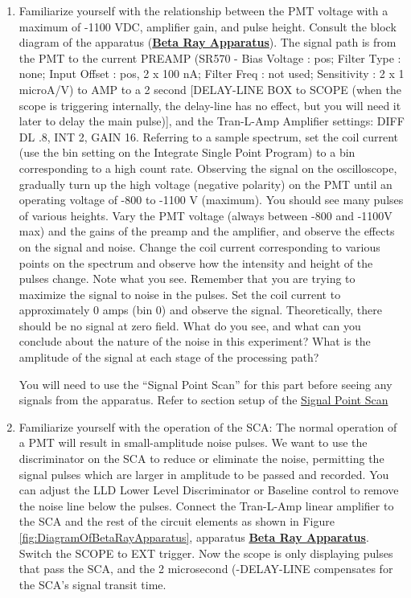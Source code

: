 \documentclass{../lab}
\begin{document}
\begin{enumerate}
    \item Familiarize yourself with the relationship between the PMT voltage with a maximum of -1100 VDC, amplifier gain, and pulse height. Consult the block diagram of the apparatus (\href{http://experimentationlab.berkeley.edu/sites/default/files/images/BRAimage010.gif}{\textbf{Beta Ray Apparatus}}). The signal path is from the PMT to the current PREAMP (SR570 - Bias Voltage : pos; Filter Type : none; Input Offset : pos, 2 x 100 nA; Filter Freq : not used; Sensitivity : 2 x 1 microA/V) to AMP to a 2 second [DELAY-LINE BOX to SCOPE (when the scope is triggering internally, the delay-line has no effect, but you will need it later to delay the main pulse)], and the Tran-L-Amp Amplifier settings: DIFF DL .8, INT 2, GAIN 16. Referring to a sample spectrum, set the coil current (use the bin setting on the Integrate Single Point Program) to a bin corresponding to a high count rate. Observing the signal on the oscilloscope, gradually turn up the high voltage (negative polarity) on the PMT until an operating voltage of -800 to -1100 V (maximum). You should see many pulses of various heights. Vary the PMT voltage (always between -800 and -1100V max) and the gains of the preamp and the amplifier, and observe the effects on the signal and noise. Change the coil current corresponding to various points on the spectrum and observe how the intensity and height of the pulses change. Note what you see. Remember that you are trying to maximize the signal to noise in the pulses. Set the coil current to approximately 0 amps (bin 0) and observe the signal. Theoretically, there should be no signal at zero field. What do you see, and what can you conclude about the nature of the noise in this experiment? What is the amplitude of the signal at each stage of the processing path?

    You will need to use the ``Signal Point Scan'' for this part before seeing any signals from the apparatus. Refer to section setup of the \hyperref[subsec:IntegrateSinglePointProgram]{Signal Point Scan}

    \item Familiarize yourself with the operation of the SCA: The normal operation of a PMT will result in small-amplitude noise pulses. We want to use the discriminator on the SCA to reduce or eliminate the noise, permitting the signal pulses which are larger in amplitude to be passed and recorded. You can adjust the LLD Lower Level Discriminator or Baseline control to remove the noise line below the pulses. Connect the Tran-L-Amp linear amplifier to the SCA and the rest of the circuit elements as shown in Figure \ref{fig:DiagramOfBetaRayApparatus}, apparatus \href{http://experimentationlab.berkeley.edu/sites/default/files/images/BRAimage010.gif}{\textbf{Beta Ray Apparatus}}. Switch the SCOPE to EXT trigger. Now the scope is only displaying pulses that pass the SCA, and the 2 microsecond (-DELAY-LINE compensates for the SCA's signal transit time.


\end{enumerate}
\end{document}
